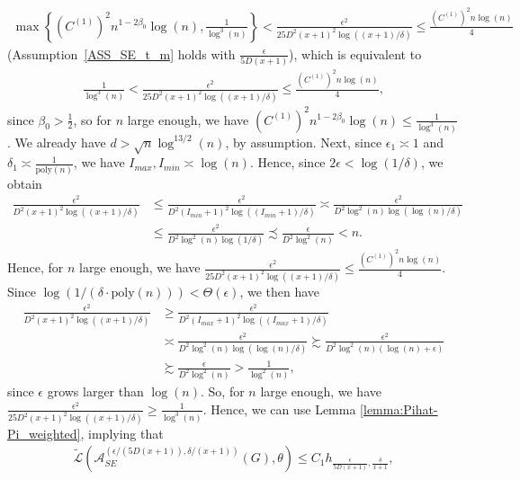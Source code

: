 \documentclass{article}
\begin{document}
\begin{align*}
\max\left\{(C^{(1)})^2n^{1 - 2\beta_0}\log(n), \frac{1}{\log^3(n)}\right\} < \frac{\epsilon^2}{25D^2(x + 1)^2\log((x + 1)/\delta)} \leq \frac{(C^{(1)})^2n\log(n)}{4}
\end{align*}
(Assumption~\ref{ASS_SE_t_m} holds with $\frac{\epsilon}{5D(x + 1)}$), which is equivalent to 
\begin{align*}
\frac{1}{\log^3(n)} < \frac{\epsilon^2}{25D^2(x + 1)^2\log((x + 1)/\delta)} \leq \frac{(C^{(1)})^2n\log(n)}{4},
\end{align*}
since $\beta_0 > \frac{1}{2}$, so for $n$ large enough, we have $(C^{(1)})^2n^{1 - 2\beta_0}\log(n) \leq \frac{1}{\log^3(n)}$. We already have $d > \sqrt{n}\log^{13/2}(n)$, by assumption. Next, since $\epsilon_1 \asymp 1$ and $\delta_1 \asymp \frac{1}{\mathrm{poly}(n)}$, we have $I_{max}, I_{min} \asymp \log(n)$. Hence, since $2\epsilon < \log(1/\delta)$, we obtain
\begin{align*}
\frac{\epsilon^2}{D^2(x + 1)^2\log((x + 1)/\delta)} & \leq \frac{\epsilon^2}{D^2(I_{min} + 1)^2\log((I_{min} + 1)/\delta)} \asymp \frac{\epsilon^2}{D^2\log^2(n)\log(\log(n)/\delta)} \\
& \leq \frac{\epsilon^2}{D^2\log^2(n)\log(1/\delta)} \precsim \frac{\epsilon}{D^2\log^2(n)} < n.
\end{align*}
Hence, for $n$ large enough, we have $\frac{\epsilon^2}{25D^2(x + 1)^2\log((x + 1)/\delta)} \leq \frac{(C^{(1)})^2n\log(n)}{4}$. Since $\log(1/(\delta \cdot \mathrm{poly}(n))) < \Theta(\epsilon)$, we then have
\begin{align*}
\frac{\epsilon^2}{D^2(x + 1)^2\log((x + 1)/\delta)} &\geq \frac{\epsilon^2}{D^2(I_{max} + 1)^2\log((I_{max} + 1)/\delta)} \\
%
& \asymp \frac{\epsilon^2}{D^2\log^2(n)\log(\log(n)/\delta)} \succsim \frac{\epsilon^2}{D^2\log^2(n)(\log(n) + \epsilon)}\\
&\succsim \frac{\epsilon}{D^2\log^2(n)} > \frac{1}{\log^2(n)},
\end{align*}
since $\epsilon$ grows larger than $\log(n)$. So, for $n$ large enough, we have $\frac{\epsilon^2}{25D^2(x + 1)^2\log((x + 1)/\delta)} \geq \frac{1}{\log^3(n)}$. Hence, we can use Lemma \ref{lemma:Pihat-Pi_weighted}, implying that 
\begin{align*}
\widetilde{\mathcal{L}}\left(\mathcal{A}_{SE}^{(\epsilon/(5D(x + 1)), \delta/(x + 1))}(G), \theta\right) \leq C_1h_{\frac{\epsilon}{5D(x + 1)}, \frac{\delta}{x + 1}},
\end{align*}
\end{document}
